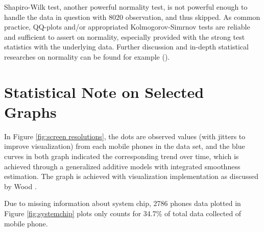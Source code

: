 \documentclass[utf8,english]{gradu3}
\begin{document}
Shapiro-Wilk test, another powerful normality test, is not powerful enough to handle the data in question with 8020 observation, and thus skipped. As common practice, QQ-plots and/or appropriated Kolmogorov-Simrnov tests are reliable and sufficient to assert on normality, especially provided with the strong test statistics with the underlying data. Further discussion and in-depth statistical researches on normality can be found for example \citeauthor{ghasemi2012normality} (\citeauthor{ghasemi2012normality}).

\section{Statistical Note on Selected Graphs}
\label{app:stats note}

In Figure \ref{fig:screen resolutions}, the dots are observed values (with jitters to improve visualization) from each mobile phones in the data set, and the blue curves in both graph indicated the corresponding trend over time, which is achieved through a generalized additive models with integrated smoothness estimation. The graph is achieved with visualization implementation as discussed by Wood \citeyear{wood2001mgcv}.

Due to missing information about system chip, 2786 phones data plotted in Figure \ref{fig:systemchip} plots only counts for 34.7\% of total data collected of mobile phone.
\end{document}

